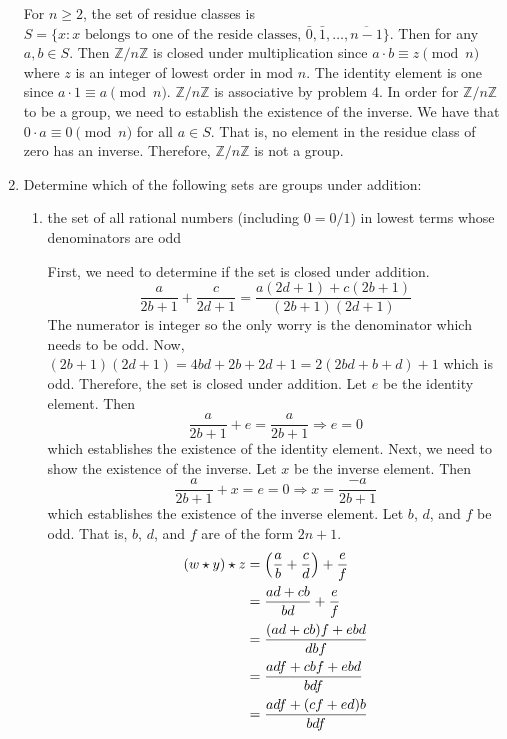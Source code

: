 \begin{enumerate}
  For \(n \geq 2\), the set of residue classes is
  \(S = \{x:x\text{ belongs to one of the reside classes, }\bar{0}, \bar{1}, \ldots, \overline{n - 1}\}\).
  Then for any \(a, b\in S\).
  Then \(\mathbb{Z}/n\mathbb{Z}\) is closed under multiplication since
  \(a\cdot b\equiv z\pmod{n}\) where \(z\) is an integer of lowest order in mod
  \(n\).
  The identity element is one since \(a\cdot 1 \equiv a\pmod{n}\).
  \(\mathbb{Z}/n\mathbb{Z}\) is associative by problem \(4\).
  In order for \(\mathbb{Z}/n\mathbb{Z}\) to be a group, we need to establish
  the existence of the inverse.
  We have that \(0\cdot a\equiv 0\pmod{n}\) for all \(a\in S\).
  That is, no element in the residue class of zero has an inverse.
  Therefore, \(\mathbb{Z}/n\mathbb{Z}\) is not a group.
\item
  Determine which of the following sets are groups under addition:
  \begin{enumerate}[label = (\alph*)]
  \item
    the set of all rational numbers (including \(0 = 0/1\)) in lowest terms
    whose denominators are odd
    \par\smallskip
    First, we need to determine if the set is closed under addition.
    \[
    \frac{a}{2b + 1} + \frac{c}{2d + 1} =
    \frac{a(2d + 1) + c(2b + 1)}{(2b + 1)(2d + 1)}
    \]
    The numerator is integer so the only worry is the denominator which needs
    to be odd.
    Now, \((2b + 1)(2d + 1) = 4bd + 2b + 2d + 1 = 2(2bd + b + d) + 1\) which is
    odd.
    Therefore, the set is closed under addition.
    Let \(e\) be the identity element.
    Then
    \[
    \frac{a}{2b + 1} + e = \frac{a}{2b + 1}\Rightarrow e = 0
    \]
    which establishes the existence of the identity element.
    Next, we need to show the existence of the inverse.
    Let \(x\) be the inverse element.
    Then
    \[
    \frac{a}{2b + 1} + x = e = 0\Rightarrow x = \frac{-a}{2b + 1}
    \]
    which establishes the existence of the inverse element.
    Let \(b\), \(d\), and \(f\) be odd.
    That is, \(b\), \(d\), and \(f\) are of the form \(2n + 1\).
    \begin{align*}
      (w\star y)\star z
      & = \Bigl(\frac{a}{b} + \frac{c}{d}\Bigr) + \frac{e}{f}\\
      &= \frac{ad + cb}{bd} + \frac{e}{f}\\
      &= \frac{(ad + cb)f + ebd}{dbf}\\
      &= \frac{adf + cbf + ebd}{bdf}\\
      &= \frac{adf + (cf + ed)b}{bdf}\\

\end{align*}
\end{enumerate}
\end{enumerate}
